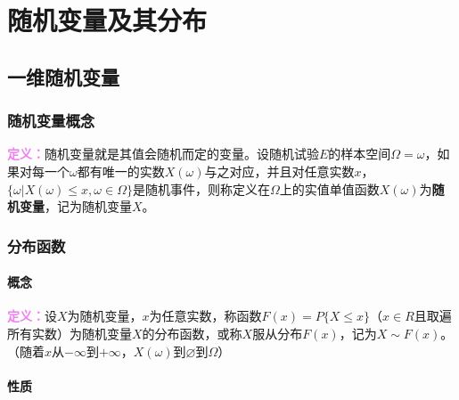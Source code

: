 \setcounter{tocdepth}{4}
\setcounter{secnumdepth}{4}
\renewcommand{\baselinestretch}{1.5}
\usepackage{diagbox}
\chapter{随机变量及其分布}
\section{一维随机变量}

\subsection{随机变量概念}

\textcolor{violet}{\textbf{定义：}}随机变量就是其值会随机而定的变量。设随机试验$E$的样本空间$\Omega={\omega}$，如果对每一个$\omega$都有唯一的实数$X(\omega)$与之对应，并且对任意实数$x$，$\{\omega|X(\omega)\leqslant x,\omega\in\Omega\}$是随机事件，则称定义在$\Omega$上的实值单值函数$X(\omega)$为\textbf{随机变量}，记为随机变量$X$。

\subsection{分布函数}

\subsubsection{概念}

\textcolor{violet}{\textbf{定义：}}设$X$为随机变量，$x$为任意实数，称函数$F(x)=P\{X\leqslant x\}$（$x\in R$且取遍所有实数）为随机变量$X$的分布函数，或称$X$服从分布$F(x)$，记为$X\sim F(x)$。（随着$x$从$-\infty$到$+\infty$，$X(\omega)$到$\varnothing$到$\Omega$）

\subsubsection{性质}

